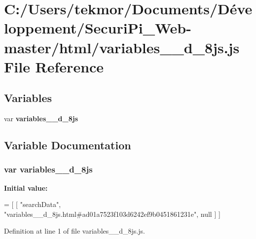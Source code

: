 \section{C\+:/\+Users/tekmor/\+Documents/\+Développement/\+Securi\+Pi\+\_\+\+Web-\/master/html/variables\+\_\+\+\_\+d\+\_\+8js.js File Reference}
\label{variables____d__8js_8js}
\subsection*{Variables}
\begin{DoxyCompactItemize}
\item 
var {\bf variables\+\_\+\+\_\+d\+\_\+8js}
\end{DoxyCompactItemize}


\subsection{Variable Documentation}
\subsubsection[{variables\+\_\+\+\_\+d\+\_\+8js}]{\setlength{\rightskip}{0pt plus 5cm}var variables\+\_\+\+\_\+d\+\_\+8js}\label{variables____d__8js_8js_aa97ed2b546a47af4bb00dd0e51310edd}
{\bfseries Initial value\+:}
\begin{DoxyCode}
=
[
    [ \textcolor{stringliteral}{"searchData"}, \textcolor{stringliteral}{"variables\_\_d\_8js.html#ad01a7523f103d6242ef9b0451861231e"}, null ]
]
\end{DoxyCode}


Definition at line 1 of file variables\+\_\+\+\_\+d\+\_\+8js.\+js.

